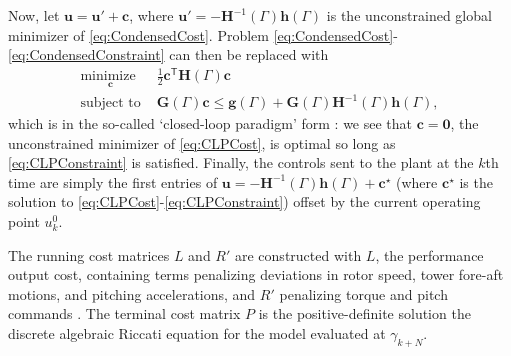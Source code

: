 \documentclass[letterpaper, 10 pt, conference]{ieeeconf}  %
\newcommand{\tran}{^{\mathsf{T}}}
\begin{document}
Now, let $\mathbf{u} = \mathbf{u'} + \mathbf{c}$, where $\mathbf{u'} = -\mathbf{H}^{-1}(\Gamma)\mathbf{h}(\Gamma)$ is the unconstrained global minimizer of \eqref{eq:CondensedCost}. Problem \eqref{eq:CondensedCost}-\eqref{eq:CondensedConstraint} can then be replaced with 
\begin{align}
\underset{\mathbf{c}}{\text{minimize }} & \frac{1}{2}\mathbf{c}\tran \mathbf{H}(\Gamma) \mathbf{c} \label{eq:CLPCost} \\
\text{subject to } &\mathbf{G}(\Gamma)\mathbf{c} \leq \mathbf{g}(\Gamma) + \mathbf{G}(\Gamma)\mathbf{H}^{-1}(\Gamma)\mathbf{h}(\Gamma), \label{eq:CLPConstraint}
\end{align}
which is in the so-called `closed-loop paradigm' form \cite{Rossiter2018}: we see that $\mathbf{c} = \mathbf{0}$, the unconstrained minimizer of \eqref{eq:CLPCost}, is optimal so long as \eqref{eq:CLPConstraint} is satisfied. Finally, the controls sent to the plant at the $k$th time are simply the first entries of $\mathbf{u} = -\mathbf{H}^{-1}(\Gamma)\mathbf{h}(\Gamma) + \mathbf{c}^\star$ (where $\mathbf{c}^\star$ is the solution to \eqref{eq:CLPCost}-\eqref{eq:CLPConstraint}) offset by the current operating point $u^0_k$. 

The running cost matrices $L$ and $R'$ are constructed with $L$, the performance output cost, containing terms penalizing deviations in rotor speed, tower fore-aft motions, and pitching accelerations, and $R'$ penalizing torque and pitch commands \cite{Sinner2018}. The terminal cost matrix $P$ is the positive-definite solution the discrete algebraic Riccati equation \cite{Rawlings2000} for the model evaluated at $\gamma_{k+N}$.
\end{document}
